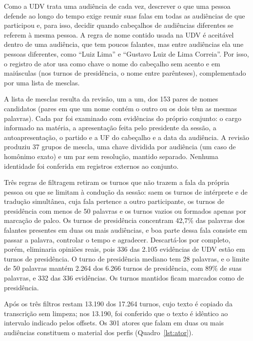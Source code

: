 Como a UDV trata uma audiência de cada vez, descrever o que uma pessoa defende ao longo do tempo
exige reunir suas falas em todas as audiências de que participou e, para isso, decidir quando
cabeçalhos de audiências diferentes se referem à mesma pessoa. A regra de nome contido usada na UDV
é aceitável dentro de uma audiência, que tem poucos falantes, mas entre audiências ela une pessoas
diferentes, como ``Luiz Lima'' e ``Gustavo Luiz de Lima Correia''. Por isso, o registro de ator usa
como chave o nome do cabeçalho sem acento e em maiúsculas (nos turnos de presidência, o nome entre
parênteses), complementado por uma lista de mesclas.

A lista de mesclas resulta da revisão, um a um, dos 153 pares de nomes candidatos (pares em que um
nome contém o outro ou os dois têm as mesmas palavras). Cada par foi examinado com
evidências do próprio conjunto: o cargo informado na matéria, a apresentação feita pelo presidente
da sessão, a autoapresentação, o partido e a UF do cabeçalho e a data da audiência. A revisão
produziu 37 grupos de mescla, uma chave dividida por audiência (um caso de homônimo exato) e um par
sem resolução, mantido separado. Nenhuma identidade foi conferida em registros externos ao conjunto.

Três regras de filtragem retiram os turnos que não trazem a fala da própria pessoa ou que se limitam
à condução da sessão: saem os turnos de intérprete e de tradução simultânea, cuja fala pertence a
outro participante, os turnos de presidência com menos de 50 palavras e os turnos vazios ou formados
apenas por marcação de palco. Os turnos de presidência concentram 42,7\% das palavras dos falantes
presentes em duas ou mais audiências, e boa parte dessa fala consiste em passar a palavra, controlar o tempo e agradecer.
Descartá-los por completo, porém, eliminaria opiniões reais, pois 336 das 2.105 evidências de UDV
estão em turnos de presidência. O turno de presidência mediano tem 28 palavras, e o limite de 50
palavras mantém 2.264 dos 6.266 turnos de presidência, com 89\% de suas palavras, e 332 das 336
evidências. Os turnos mantidos ficam marcados como de presidência.

Após os três filtros restam 13.190 dos 17.264 turnos, cujo texto é copiado da transcrição sem
limpeza; nos 13.190, foi conferido que o texto é idêntico ao intervalo indicado pelos offsets. Os
301 atores que falam em duas ou mais audiências constituem o material dos perfis
(Quadro~\ref{lst:ator}).


